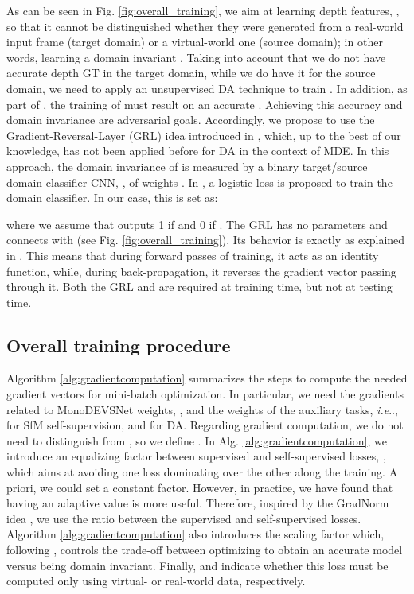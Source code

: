 \documentclass[journal]{IEEEtran}
\makeatletter
\DeclareRobustCommand\onedot{\futurelet\@let@token\@onedot}
\def\@onedot{\ifx\@let@token.\else.\null\fi\xspace}
\def\ie{\emph{i.e}\onedot} \def\Ie{\emph{I.e}\onedot}
\newcommand{\Fig}[1]{Fig. \ref{fig:#1}}
\newcommand{\Alg}[1]{Alg. \ref{alg:#1}}
\makeatother
\begin{document}
As can be seen in \Fig{overall_training}, we aim at learning depth features, , so that it cannot be distinguished whether they were generated from a real-world input frame (target domain) or a virtual-world one (source domain); in other words, learning a domain invariant . Taking into account that we do not have accurate depth GT in the target domain, while we do have it for the source domain, we need to apply an unsupervised DA technique to train . In addition, as part of , the training of  must result on an accurate . Achieving this accuracy and domain invariance are adversarial goals. Accordingly, we propose to use the Gradient-Reversal-Layer (GRL) idea introduced in \cite{Ganin:2015}, which, up to the best of our knowledge, has not been applied before for DA in the context of MDE. In this approach, the domain invariance of  is measured by a binary target/source domain-classifier CNN, , of weights . In \cite{Ganin:2015}, a logistic loss is proposed to train the domain classifier. In our case, this is set as:

\noindent where we assume that  outputs 1 if  and 0 if  . The GRL has no parameters and connects  with  (see \Fig{overall_training}). Its behavior is exactly as explained in \cite{Ganin:2015}. This means that during forward passes of training, it acts as an identity function, while, during back-propagation, it reverses the gradient vector passing through it. Both the GRL and  are required at training time, but not at testing time.

\subsection{Overall training procedure} 
\label{ssec:traininprocedure}
Algorithm \ref{alg:gradientcomputation} summarizes the steps to compute the needed gradient vectors for mini-batch optimization. In particular, we need the gradients related to MonoDEVSNet weights, , and the weights of the auxiliary tasks, {\ie},  for SfM self-supervision, and  for DA. Regarding gradient computation, we do not need to distinguish  from , so we define . In \Alg{gradientcomputation}, we introduce an equalizing factor between supervised and self-supervised losses, , which aims at avoiding one loss dominating over the other along the training. A priori, we could set a constant factor. However, in practice, we have found that having an adaptive value is more useful. Therefore, inspired by the GradNorm idea \cite{Chen:2018GradNorm}, we use the ratio between the supervised and self-supervised losses. Algorithm \ref{alg:gradientcomputation} also introduces the scaling factor  which, following \cite{Ganin:2015}, controls the trade-off between optimizing  to obtain an accurate  model versus being domain invariant. Finally,  and  indicate whether this loss must be computed only using virtual- or real-world data, respectively.  
\end{document}
